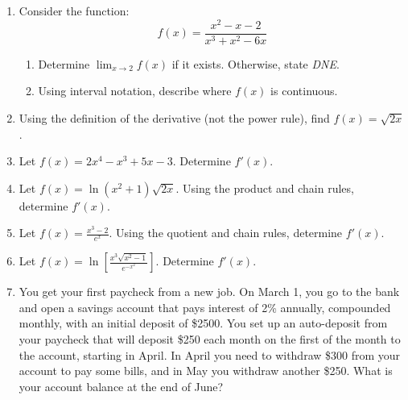 \documentclass[letterpaper,12pt,fleqn]{article}
\begin{document}
\begin{enumerate}[left=0pt]
\item Consider the function:
  \[f(x)=\frac{x^2-x-2}{x^3+x^2-6x}\]
  \begin{enumerate}
  \item Determine \(\displaystyle\lim_{x\to2}f(x)\) if it exists.  Otherwise, state \emph{DNE}.

    \vspace{3in}

  \item Using interval notation, describe where \(f(x)\) is continuous.
  \end{enumerate}

  \newpage

\item Using the definition of the derivative (not the power rule), find \(f(x)=\sqrt{2x}\).

  \vspace{5in}

\item Let \(\displaystyle f(x)=2x^4-x^3+5x-3\).  Determine \(f'(x)\).

  \newpage

\item Let \(\displaystyle f(x)=\ln(x^2+1)\sqrt{2x}\).  Using the product and chain rules, determine \(f'(x)\).

  \vspace{2in}

\item Let \(\displaystyle f(x)=\frac{x^3-2}{e^x}\).  Using the quotient and chain rules, determine \(f'(x)\).

  \vspace{2in}

\item Let \(\displaystyle f(x)=\ln\left[\frac{x^3\sqrt{x^2-1}}{e^{-x^2}}\right]\).  Determine \(f'(x)\).

  \newpage

\item You get your first paycheck from a new job.  On March 1, you go to the bank and open a savings account that
  pays interest of 2\% annually, compounded monthly, with an initial deposit of \$2500.  You set up an auto-deposit
  from your paycheck that will deposit \$250 each month on the first of the month to the account, starting in
  April.  In April you need to withdraw \$300 from your account to pay some bills, and in May you withdraw another
  \$250.  What is your account balance at the end of June?


\end{enumerate}
\end{document}

